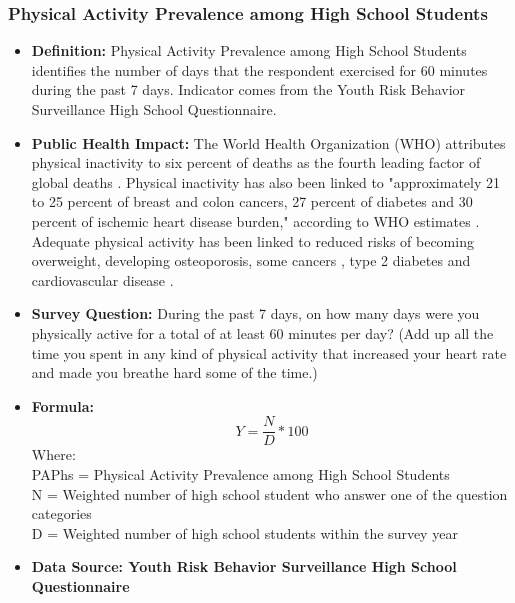 \documentclass[12pt,letterpaper]{report}
\begin{document}
		\subsubsection{Physical Activity Prevalence among High School Students} 
	\begin{itemize}
		\item \textbf{Definition:} Physical Activity Prevalence among High School Students identifies the number of days that the respondent exercised for 60 minutes during the past 7 days. Indicator comes from the Youth Risk Behavior Surveillance High School Questionnaire.
		\item \textbf{Public Health Impact:} The World Health Organization (WHO) attributes physical inactivity to six percent of deaths as the fourth leading factor of global deaths \cite{mathers2009global}. Physical inactivity has also been linked to "approximately 21 to 25 percent of breast and colon cancers, 27 percent of diabetes and 30 percent of ischemic heart disease burden," according to WHO estimates \cite{mathers2009global}. Adequate physical activity has been linked to reduced risks of becoming overweight, developing osteoporosis, some cancers \cite{kushi2006american}, type 2 diabetes and cardiovascular disease \cite{lifshitz2002reduction} \cite{bassuk2005epidemiological} \cite{healy2008objectively}.
		\item \textbf{Survey Question:} During the past 7 days, on how many days were you physically active for a total of at least 60 minutes per day? (Add up all the time you spent in any kind of physical activity that increased your heart rate and made you breathe hard some of the time.)
		\item \textbf{Formula:} 
			\begin{equation}
				Y = \frac{N}{D} *100
			\end{equation}
Where: \\
			PAPhs = Physical Activity Prevalence among High School Students\\
			
			N = Weighted number of high school student who answer one of the question categories\\
			
			D = Weighted number of high school students within the survey year \\
			
		\item \textbf{Data Source: Youth Risk Behavior Surveillance High School Questionnaire}
	\end{itemize}
\end{document}
